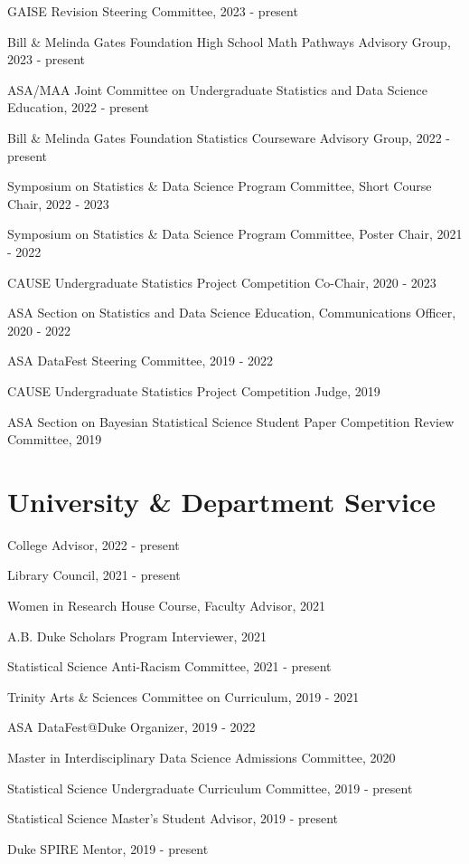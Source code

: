 \documentclass[11pt,dvipsnames]{article}
\begin{document}
GAISE Revision Steering Committee, 2023 - present

Bill \& Melinda Gates Foundation High School Math Pathways Advisory
Group, 2023 - present

ASA/MAA Joint Committee on Undergraduate Statistics and Data Science
Education, 2022 - present

Bill \& Melinda Gates Foundation Statistics Courseware Advisory Group,
2022 - present

Symposium on Statistics \& Data Science Program Committee, Short Course
Chair, 2022 - 2023

Symposium on Statistics \& Data Science Program Committee, Poster Chair,
2021 - 2022

CAUSE Undergraduate Statistics Project Competition Co-Chair, 2020 - 2023

ASA Section on Statistics and Data Science Education, Communications
Officer, 2020 - 2022

ASA DataFest Steering Committee, 2019 - 2022

CAUSE Undergraduate Statistics Project Competition Judge, 2019

ASA Section on Bayesian Statistical Science Student Paper Competition
Review Committee, 2019

\section{University \& Department
Service}\label{university-department-service}

College Advisor, 2022 - present

Library Council, 2021 - present

Women in Research House Course, Faculty Advisor, 2021

A.B. Duke Scholars Program Interviewer, 2021

Statistical Science Anti-Racism Committee, 2021 - present

Trinity Arts \& Sciences Committee on Curriculum, 2019 - 2021

ASA DataFest@Duke Organizer, 2019 - 2022

Master in Interdisciplinary Data Science Admissions Committee, 2020

Statistical Science Undergraduate Curriculum Committee, 2019 - present

Statistical Science Master's Student Advisor, 2019 - present

Duke SPIRE Mentor, 2019 - present
\end{document}
